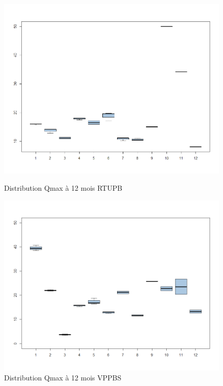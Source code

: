 %
%

\begin{figure}[h]
    \begin{minipage}[c]{.46\linewidth}
        \centering
        \includegraphics[width=1\textwidth]{../Fig/RTUPB/rtupb-qmax-k12-distribution.png}
        \caption{Distribution Qmax à 12 mois RTUPB}
    \end{minipage}
    \hfill%
    \begin{minipage}[c]{.46\linewidth}
        \centering
        \includegraphics[width=1\textwidth]{../Fig/VPPBS/vppbs-qmax-k12-distribution.png}
        \caption{Distribution Qmax à 12 mois VPPBS}
    \end{minipage}
\end{figure}

